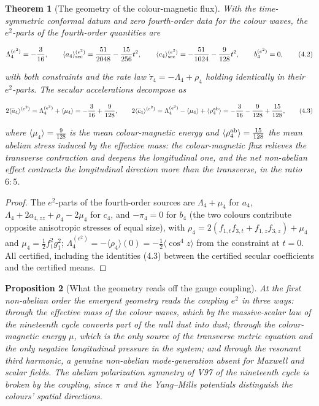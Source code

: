 \documentclass[11pt]{article}
\newtheorem{theorem}{Theorem}[section]
\newtheorem{proposition}[theorem]{Proposition}
\theoremstyle{remark}
\begin{document}
\begin{theorem}[The geometry of the colour-magnetic flux]
\label{thm:v20v1-geometry}
With the time-symmetric conformal datum and zero fourth-order data for
the colour waves, the \(e^2\)-parts of the fourth-order quantities are

\[
 \Lambda_4^{(e^2)}=-\frac3{16},\qquad
 \langle a_4\rangle^{(e^2)}_{\rm sec}=\frac{51}{2048}-\frac{15}{256}t^2,\qquad
 \langle c_4\rangle^{(e^2)}_{\rm sec}=-\frac{51}{1024}-\frac9{128}t^2,\qquad
 b_4^{(e^2)}=0,                                                         \tag{4.2}
\]

with both constraints and the rate law
\(\dot\tau_4=-\Lambda_4+\rho_4\) holding identically in their
\(e^2\)-parts.  The secular accelerations decompose as

\[
 2\langle\ddot a_4\rangle^{(e^2)}=\Lambda_4^{(e^2)}+\langle\mu_4\rangle=-\frac3{16}+\frac9{128},\qquad
 2\langle\ddot c_4\rangle^{(e^2)}=\Lambda_4^{(e^2)}-\langle\mu_4\rangle+\langle\rho^{\rm ab}_4\rangle
 =-\frac3{16}-\frac9{128}+\frac{15}{128},                               \tag{4.3}
\]

where \(\langle\mu_4\rangle=\tfrac9{128}\) is the mean colour-magnetic
energy and \(\langle\rho^{\rm ab}_4\rangle=\tfrac{15}{128}\) the mean
abelian stress induced by the effective mass: the colour-magnetic flux
relieves the transverse contraction and deepens the longitudinal one,
and the net non-abelian effect contracts the longitudinal direction
more than the transverse, in the ratio \(6:5\).
\end{theorem}

\begin{proof}
The \(e^2\)-parts of the fourth-order sources are \(\Lambda_4+\mu_4\)
for \(a_4\), \(\Lambda_4+2a_{4,zz}+\rho_4-2\mu_4\) for \(c_4\), and
\(-\pi_4=0\) for \(b_4\) (the two colours contribute opposite
anisotropic stresses of equal size), with
\(\rho_4=2(f_{1,t}f_{3,t}+f_{1,z}f_{3,z})+\mu_4\) and
\(\mu_4=\tfrac12f_1^2g_1^2\); \(\Lambda_4^{(e^2)}=-\langle\rho_4\rangle(0)=-\tfrac12\langle\cos^4z\rangle\)
from the constraint at \(t=0\).  All certified, including the
identities (4.3) between the certified secular coefficients and the
certified means.
\end{proof}

\begin{proposition}[What the geometry reads off the gauge coupling]
\label{prop:v20v1-reading}
At the first non-abelian order the emergent geometry reads the
coupling \(e^2\) in three ways: through the effective mass of the
colour waves, which by the massive-scalar law of the nineteenth cycle
converts part of the null dust into dust; through the colour-magnetic
energy \(\mu\), which is the only source of the transverse metric
equation and the only negative longitudinal pressure in the system;
and through the resonant third harmonic, a genuine non-abelian
mode-generation absent for Maxwell and scalar fields.  The abelian
polarization symmetry of V97 of the nineteenth cycle is broken by
the coupling, since \(\pi\) and the Yang--Mills potentials
distinguish the colours' spatial directions.
\end{proposition}
\end{document}
